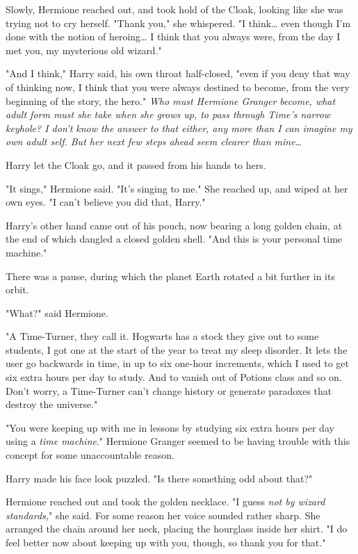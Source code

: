 Slowly, Hermione reached out, and took hold of the Cloak, looking like she was
trying not to cry herself. "Thank you," she whispered. "I think{\ldots} even
though I'm done with the notion of heroing{\ldots} I think that you always
were, from the day I met you, my mysterious old wizard."

"And I think," Harry said, his own throat half-closed, "even if you deny that
way of thinking now, I think that you were always destined to become, from the
very beginning of the story, the hero." \emph{Who must Hermione Granger become,
what adult form must she take when she grows up, to pass through Time's narrow
keyhole? I don't know the answer to that either, any more than I can imagine my
own adult self. But her next few steps ahead seem clearer than mine{\ldots}}

Harry let the Cloak go, and it passed from his hands to hers\emph{.}

"It sings," Hermione said. "It's singing to me." She reached up, and wiped at
her own eyes. "I can't believe you did that, Harry."

Harry's other hand came out of his pouch, now bearing a long golden chain, at
the end of which dangled a closed golden shell. "And this is your personal time
machine."

There was a pause, during which the planet Earth rotated a bit further in its
orbit.

"What?" said Hermione.

"A Time-Turner, they call it. Hogwarts has a stock they give out to some
students, I got one at the start of the year to treat my sleep disorder. It
lets the user go backwards in time, in up to six one-hour increments, which I
used to get six extra hours per day to study. And to vanish out of Potions
class and so on. Don't worry, a Time-Turner can't change history or generate
paradoxes that destroy the universe."

"You were keeping up with me in lessons by studying six extra hours per day
using a \emph{time machine}." Hermione Granger seemed to be having trouble with
this concept for some unaccountable reason.

Harry made his face look puzzled. "Is there something odd about that?"

Hermione reached out and took the golden necklace. "I guess \emph{not by wizard
standards,}" she said. For some reason her voice sounded rather sharp. She
arranged the chain around her neck, placing the hourglass inside her shirt. "I
do feel better now about keeping up with you, though, so thank you for that."

